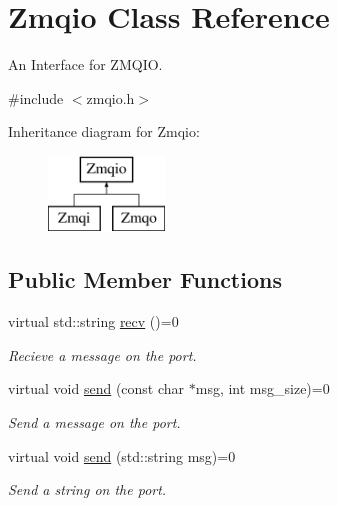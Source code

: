 \hypertarget{classZmqio}{\section{Zmqio Class Reference}
\label{classZmqio}
}


An Interface for Z\-M\-Q\-I\-O.  




{\ttfamily \#include $<$zmqio.\-h$>$}

Inheritance diagram for Zmqio\-:\begin{figure}[H]
\begin{center}
\leavevmode
\includegraphics[height=2.000000cm]{classZmqio}
\end{center}
\end{figure}
\subsection*{Public Member Functions}
\begin{DoxyCompactItemize}
\item 
\hypertarget{classZmqio_a9365ac0ed42905898502e16857997acc}{virtual std\-::string \hyperlink{classZmqio_a9365ac0ed42905898502e16857997acc}{recv} ()=0}\label{classZmqio_a9365ac0ed42905898502e16857997acc}

\begin{DoxyCompactList}\small\item\em Recieve a message on the port. \end{DoxyCompactList}\item 
\hypertarget{classZmqio_a858e00e8ac5c4d1d60c665fa7c0716f0}{virtual void \hyperlink{classZmqio_a858e00e8ac5c4d1d60c665fa7c0716f0}{send} (const char $\ast$msg, int msg\-\_\-size)=0}\label{classZmqio_a858e00e8ac5c4d1d60c665fa7c0716f0}

\begin{DoxyCompactList}\small\item\em Send a message on the port. \end{DoxyCompactList}\item 
\hypertarget{classZmqio_a079f5752b553ddb2e5a2da565bcf162c}{virtual void \hyperlink{classZmqio_a079f5752b553ddb2e5a2da565bcf162c}{send} (std\-::string msg)=0}\label{classZmqio_a079f5752b553ddb2e5a2da565bcf162c}

\begin{DoxyCompactList}\small\item\em Send a string on the port. \end{DoxyCompactList}\end{DoxyCompactItemize}


